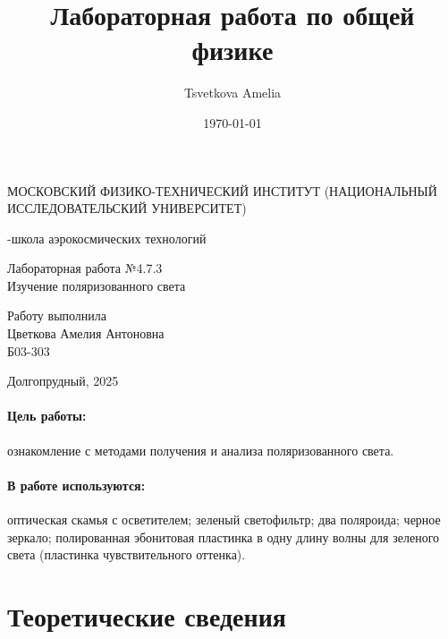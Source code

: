 \documentclass[a4paper,12pt]{article}
\author{Tsvetkova Amelia}
\title{Лабораторная работа по общей физике}
\date{\today}
\begin{document}
\begin{titlepage}
    \newpage
    \begin{center}
    {\large МОСКОВСКИЙ ФИЗИКО-ТЕХНИЧЕСКИЙ ИНСТИТУТ (НАЦИОНАЛЬНЫЙ ИССЛЕДОВАТЕЛЬСКИЙ УНИВЕРСИТЕТ)}
    \vspace{1cm}

    {-школа аэрокосмических технологий}
    \vspace{6em}
    \end{center}
    
    \vspace{1.2em}

    \begin{center}
    \Large Лабораторная работа №4.7.3 \\
    Изучение поляризованного света
    \linebreak
    \end{center}
    
    \vspace{11em}
    
    \begin{flushright}
                       {\large Работу выполнила\\
                       Цветкова Амелия Антоновна\\
                       Б03-303 }
    \end{flushright}

    \vspace{\fill}

    \begin{center}
    Долгопрудный, 2025
    \end{center}

    \end{titlepage}

\paragraph{Цель работы:} ознакомление с методами получения и анализа поляризованного света.

\paragraph{В работе используются:} оптическая скамья с осветителем; зеленый светофильтр; два поляроида; черное зеркало; полированная эбонитовая пластинка в одну длину волны для зеленого света (пластинка чувствительного оттенка).

\section{Теоретические сведения}
\end{document}
